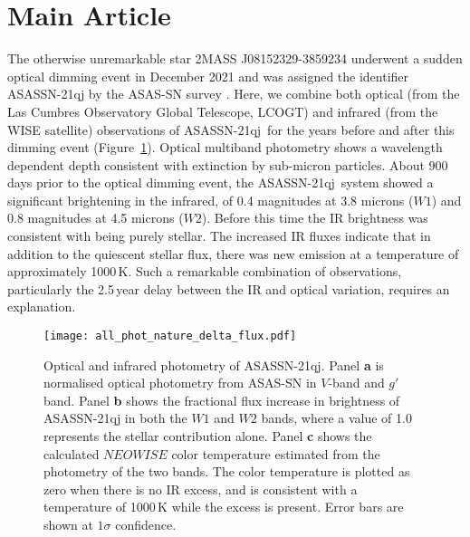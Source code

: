 \documentclass[sn-nature]{sn-jnl}%
\newcommand{\asas}{ASASSN-21qj}
\begin{document}
\section{Main Article}\label{sec1}






The otherwise unremarkable star 2MASS J08152329-3859234 underwent a sudden optical dimming event in December 2021 \cite{RizzoSmith21,RizzoSmith22} and was assigned the identifier \asas{} by the ASAS-SN survey \citep{shappee_man_2014,kochanek_all-sky_2017}.
%
Here, we combine both optical (from the Las Cumbres Observatory Global Telescope, LCOGT) and infrared (from the WISE satellite) observations of \asas~for the years before and after this dimming event (Figure~\ref{fig:wisephot}). 
%
Optical multiband photometry shows a wavelength dependent depth consistent with extinction by sub-micron particles.
%
About 900 days prior to the optical dimming event, the \asas~system showed a significant brightening in the infrared, of 0.4 magnitudes at 3.8 microns ($W1$) and 0.8 magnitudes at 4.5 microns ($W2$).
%
Before this time the IR brightness was consistent with being purely stellar.
%
The increased IR fluxes indicate that in addition to the quiescent stellar flux, there was new emission at a temperature of approximately 1000\,K.
%
Such a remarkable combination of observations, particularly the 2.5\,year delay between the IR and optical variation, requires an explanation.

\begin{figure}
\begin{centering}
\texttt{[image: all\_phot\_nature\_delta\_flux.pdf]}
\caption{Optical and infrared photometry of ASASSN-21qj.
%
Panel {\bf a} is normalised optical photometry from ASAS-SN in $V$-band and $g'$ band.
%
Panel {\bf b} shows the fractional flux increase in brightness of ASASSN-21qj in both the $W1$ and $W2$ bands, where a value of 1.0 represents the stellar contribution alone.
%
Panel {\bf c} shows the calculated $NEOWISE$ color temperature estimated from the photometry of the two bands.
%
The color temperature is plotted as zero when there is no IR excess, and is consistent with a temperature of 1000\,K while the excess is present.
%
Error bars are shown at $1\sigma$ confidence.
}
\label{fig:wisephot}
\end{centering}
\end{figure}
\end{document}
